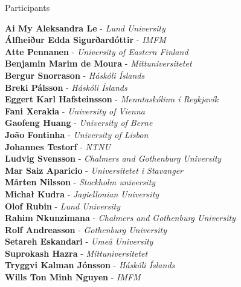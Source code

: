 \documentclass[12pt, openany, twoside]{report}      %
\begin{document}
\noindent
{\LARGE Participants}

\bigskip
\bigskip
\noindent
\textbf{Ai My Aleksandra Le} -
\textit{Lund University}
\\
\textbf{Álfheiður Edda Sigurðardóttir} -
\textit{IMFM}
\\
\textbf{Atte Pennanen} -
\textit{University of Eastern Finland}
\\
\textbf{Benjamin Marim de Moura} -
\textit{Mittuniversitetet}
\\
\textbf{Bergur Snorrason} -
\textit{Háskóli Íslands}
\\
\textbf{Breki Pálsson} -
\textit{Háskóli Íslands}
\\
\textbf{Eggert Karl Hafsteinsson} -
\textit{Menntaskólinn í Reykjavík}
\\
\textbf{Fani Xerakia} -
\textit{University of Vienna}
\\
\textbf{Gaofeng Huang} -
\textit{University of Berne}
\\
\textbf{João Fontinha} -
\textit{University of Lisbon}
\\
\textbf{Johannes Testorf} -
\textit{NTNU}
\\
\textbf{Ludvig Svensson} -
\textit{Chalmers and Gothenburg University}
\\
\textbf{Mar Saiz Aparicio} -
\textit{Universitetet i Stavanger}
\\
\textbf{Mårten Nilsson} -
\textit{Stockholm university}
\\
\textbf{Michał Kudra} -
\textit{Jagiellonian University}
\\
\textbf{Olof Rubin} -
\textit{Lund University}
\\
\textbf{Rahim Nkunzimana} -
\textit{Chalmers and Gothenburg University}
\\
\textbf{Rolf Andreasson} -
\textit{Gothenburg University}
\\
\textbf{Setareh Eskandari} -
\textit{Umeå University}
\\
\textbf{Suprokash Hazra} -
\textit{Mittuniversitetet}
\\
\textbf{Tryggvi Kalman Jónsson} -
\textit{Háskóli Íslands}
\\
\textbf{Wills Ton Minh Nguyen} -
\textit{IMFM}
\restoregeometry

\newpage
\end{document}
